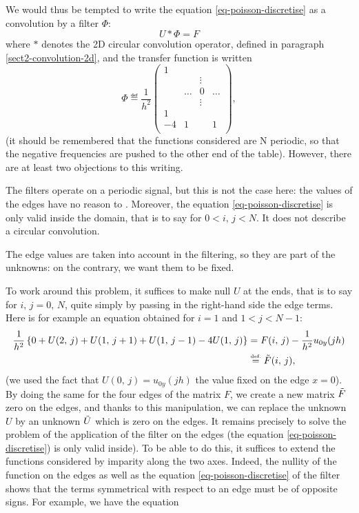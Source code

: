 
  We would thus be tempted to write the equation \eqref{eq-poisson-discretise} as a convolution by a filter $ \Phi $:
\begin{equation*}
U * \Phi = F
\end{equation*}
 where $ * $ denotes the 2D circular convolution operator, defined in paragraph \ref{sect2-convolution-2d}, and the transfer function is written
\begin{equation}
\label{eq-filter-eq-fish}
\Phi \eqdef \frac{1}{h^2} \begin{pmatrix} 1 & & & \\& & \vdots & \\& \ldots & 0 & \ldots \\& & \vdots & \\1 & & & \\-4 & 1 & & 1 \\\end{pmatrix},
\end{equation}
(it should be remembered that the functions considered are N periodic, so that the negative frequencies are pushed to the other end of the table). However, there are at least two objections to this writing. \begin{rs}
\item The filters operate on a periodic signal, but this is not the case here: the values of the edges have no reason to . Moreover, the equation \eqref{eq-poisson-discretise} is only valid inside the domain, that is to say for $ 0 <i, \, j <N $. It does not describe a circular convolution.
\item The edge values are taken into account in the filtering, so they are part of the unknowns: on the contrary, we want them to be fixed.
\end{rs} To work around this problem, it suffices to make null $ U $ at the ends, that is to say for $ i, \, j = 0, \, N $, quite simply by passing in the right-hand side the edge terms. Here is for example an equation obtained for $ i = 1 $ and $ 1 <j <N-1 $:
\begin{equation*}
\begin{split}
\frac{1}{h^2} \left\{0 + U (2, \, j) + U (1, \, j + 1) + U (1, \, j-1) - 4 U ( 1, \, j) \right\} & = F (i, \, j) - \frac{1}{h^2} u_{0y} (jh) \\
& \stackrel{\mbox{\upshape\tiny def.}}{=} \tilde{F} (i, \, j),
\end{split}
\end{equation*}
(we used the fact that $ U (0, \, j) = u_{0y} (jh) $ the value fixed on the edge $ x = 0 $). By doing the same for the four edges of the matrix $ F $, we create a new matrix $ \tilde{F} $ zero on the edges, and thanks to this manipulation, we can replace the unknown $ U $ by an unknown $ \tilde{U} $ which is zero on the edges. It remains precisely to solve the problem of the application of the filter on the edges (the equation \eqref{eq-poisson-discretise}) is only valid inside). To be able to do this, it suffices to extend the functions considered by imparity along the two axes. Indeed, the nullity of the function on the edges as well as the equation \eqref{eq-poisson-discretise} of the filter shows that the terms symmetrical with respect to an edge must be of opposite signs. For example, we have the equation

